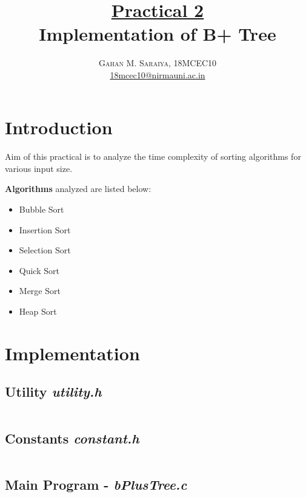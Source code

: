 \documentclass[paper=letter, fontsize=12pt]{article}
\title{\vspace{-15mm}\fontsize{24pt}{10pt}\selectfont\textbf{
		\underline{Practical 2}\\Implementation of B+ Tree}} %
\author{\large{\textsc{
		Gahan M. Saraiya, 18MCEC10 }}\\[2mm]
\normalsize \href{mailto:18mcec10@nirmauni.ac.in}{18mcec10@nirmauni.ac.in}\\[2mm] %
}
\date{}
\begin{document}
\maketitle %
\thispagestyle{fancy} %

\newcommand*\tick{\item[\Checkmark]}
\newcommand*\arrow{\item[$\Rightarrow$]}
\newcommand*\fail{\item[\XSolidBrush]}

\section{Introduction}
\paragraph{}
Aim of this practical is to analyze the time complexity of sorting algorithms for various input size.

\textbf{Algorithms} analyzed are listed below:
\begin{itemize}
	\item Bubble Sort
	\item Insertion Sort
	\item Selection Sort
	\item Quick Sort
	\item Merge Sort
	\item Heap Sort
\end{itemize}

\section{Implementation}

\subsection{Utility \textbf{\textit{utility.h}}}
\inputminted[frame=lines, breaklines, linenos]{c}{../utility.h}

\subsection{Constants \textbf{\textit{constant.h}}}
\inputminted[frame=lines, breaklines, linenos]{c}{../constant.h}

\subsection{Main Program - \textbf{\textit{bPlusTree.c}}}
\inputminted[frame=lines, breaklines, linenos]{c}{../bPlusTree.c}
\end{document}
